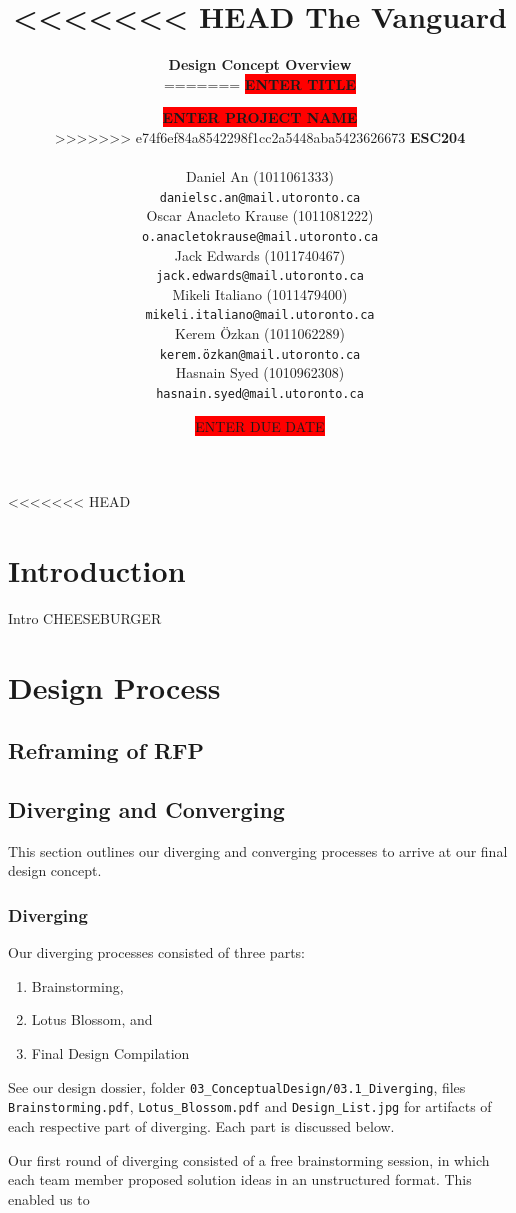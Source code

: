 \documentclass[12pt, letterpaper, titlepage]{article}
\title{
<<<<<<< HEAD
 \textbf{The Vanguard}
}
\author{
 \large{\textbf{Design Concept Overview}} \\
=======
 \textbf{\colorbox{red}{ENTER TITLE}}
}
\author{
 \large{\textbf{\colorbox{red}{ENTER PROJECT NAME}}} \\
>>>>>>> e74f6ef84a8542298f1cc2a5448aba5423626673
 \large{\textbf{ESC204}} \\
 \\
 Daniel An (1011061333) \\ 
 \vspace{0.9em}
 \texttt{danielsc.an@mail.utoronto.ca} \\
 Oscar Anacleto Krause (1011081222) \\ 
 \vspace{0.9em}
 \texttt{o.anacletokrause@mail.utoronto.ca} \\
 Jack Edwards (1011740467) \\
 \vspace{0.9em}
 \texttt{jack.edwards@mail.utoronto.ca} \\
 Mikeli Italiano (1011479400) \\
 \vspace{0.9em}
 \texttt{mikeli.italiano@mail.utoronto.ca} \\
 Kerem \"{O}zkan (1011062289) \\
 \vspace{0.9em}
 \texttt{kerem.\"{o}zkan@mail.utoronto.ca} \\
 Hasnain Syed (1010962308) \\
 \vspace{0.9em}
 \texttt{hasnain.syed@mail.utoronto.ca}
}
\date{\colorbox{red}{ENTER DUE DATE}}
\begin{document}
 \maketitle
 \newpage

\newpage

<<<<<<< HEAD
\tableofcontents

\newpage

\section{Introduction} \label{intro}
Intro CHEESEBURGER

\section{Design Process}
\subsection{Reframing of RFP}
\subsection{Diverging and Converging}

This section outlines our diverging and converging processes to arrive at our final design concept.

\subsubsection{Diverging}

\noindent Our diverging processes consisted of three parts:
\begin{enumerate}
    \item Brainstorming,
    \item Lotus Blossom, and
    \item Final Design Compilation
\end{enumerate}

See our design dossier, folder \texttt{03\_ConceptualDesign/03.1\_Diverging}, files \texttt{Brainstorming.pdf}, \texttt{Lotus\_Blossom.pdf} and \texttt{Design\_List.jpg} for artifacts of each respective part of diverging. Each part is discussed below.


Our first round of diverging consisted of a free brainstorming session, in which each team member proposed solution ideas in an unstructured format. This enabled us to 
\end{document}
